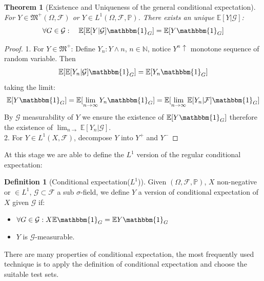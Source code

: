 \documentclass[a4paper,11pt]{book}
\newtheorem{theorem}{Theorem}[section]
\theoremstyle{definition}
\newtheorem{definition}{Definition}[section]
\theoremstyle{remark}
\begin{document}
\begin{theorem}[Existence and Uniqueness of the general conditional expectation] 
For $Y \in \mathfrak{M}^+(\Omega, \mathcal{F})$ or $Y \in L^1(\Omega, \mathcal{F}, \mathbb{P})$. There exists an unique $\mathbb{E}[Y|\mathcal{G}]$:
		\begin{equation*}
			\forall G \in \mathcal{G}: \quad \mathbb{E}[\mathbb{E}[Y|\mathcal{G}] \mathbbm{1}_G] = \mathbb{E}[Y \mathbbm{1}_G]
		\end{equation*}
\end{theorem}
\begin{proof}
	1. For $Y \in \mathfrak{M}^+$: Define $Y_n: Y \wedge n$, $n \in \mathbb{N}$, notice $Y^n \uparrow$ monotone sequence of random variable. Then 
	\begin{align*}
		\mathbb{E}[\mathbb{E}[Y_n|\mathcal{G}] \mathbbm{1}_G] =  \mathbb{E}[Y_n \mathbbm{1}_G]
	\end{align*}
	taking the limit:
	\begin{align*}
		\mathbb{E}[Y\mathbbm{1}_G] = \mathbb{E}[\lim_{n \rightarrow \infty} Y_n \mathbbm{1}_G] = \mathbb{E}[\lim_{n \rightarrow \infty}\mathbb{E}[Y_n|\mathcal{F}] \mathbbm{1}_G]
	\end{align*}
	By $\mathcal{G}$ measurability of $Y$ we ensure the existence of $\mathbb{E}[Y\mathbbm{1}_G]$ therefore the existence of $\lim_{n \rightarrow} \mathbb{E}[Y_n|\mathcal{G}]$.\\
	2. For $Y \in L^1(X, \mathcal{F})$, decompose $Y$ into $Y^+$ and $Y^-$ 
\end{proof}


At this stage we are able to define the $L^1$ version of the regular conditional expectation:
\begin{definition}[Conditional expectation($L^1$)]
	Given $(\Omega, \mathcal{F}, \mathbb{P})$, $X$ non-negative or $\in L^1$, $\mathcal{G} \subset \mathcal{F}$ a sub $\sigma$-field, we define $Y$ a version of conditional expectation of $X$ given $\mathcal{G}$ if:
	\begin{itemize}
		\item $\forall G \in \mathcal{G}: X \mathbb{E} \mathbbm{1}_G = \mathbb{E} Y \mathbbm{1}_G$
		\item $Y$ is $\mathcal{G}$-measurable.
	\end{itemize}
\end{definition}

There are many properties of conditional expectation, the most frequently used technique is to apply the definition of conditional expectation and choose the suitable test sets.
\end{document}
